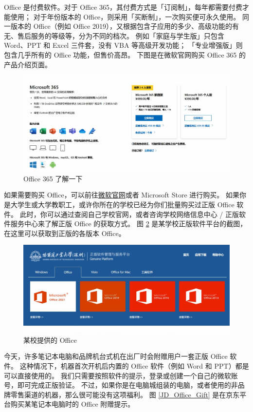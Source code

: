 Office 是付费软件。对于 Office 365，其付费方式是「订阅制」，每年都需要付费才能使用；
对于年份版本的 Office，则采用「买断制」，一次购买便可永久使用。
同一版本的 Office（例如 Office 2019），又根据包含子应用的多少、高级功能的有无、售后服务的等级等，分为不同的档次。
例如「家庭与学生版」只包含 Word、PPT 和 Excel 三件套，没有 VBA 等高级开发功能；
「专业增强版」则包含几乎所有的 Office 功能，但售价高昂。
下图是在微软官网购买 Office 365 的产品介绍页面。

\begin{figure}[htb!]
  \centering
  \includegraphics[width=12cm]{assets/Office_365.jpg}
  \caption{Office 365 了解一下}
  \label{Office_365}
\end{figure}

如果需要购买 Office，可以前往\href{https://www.microsoft.com/zh-CN/microsoft-365/buy/microsoft-365}{微软官网}或者 Microsoft Store 进行购买。
如果你是大学生或大学教职工，或许你所在的学校已经为你们批量购买过正版 Office 软件。
此时，你可以通过查阅自己学校官网，或者咨询学校网络信息中心 / 正版软件服务中心来了解正版 Office 的获取方式。
图 \ref{College_Office} 是某学校正版软件平台的截图，在这里可以获取到正版的各版本 Office。

\begin{figure}[htb!]
  \centering
  \includegraphics[width=12cm]{assets/College_Office.jpg}
  \caption{某校提供的 Office}
  \label{College_Office}
\end{figure}

今天，许多笔记本电脑和品牌机台式机在出厂时会附赠用户一套正版 Office 软件。
这种情况下，机器首次开机后内置的 Office 软件（例如 Word 和 PPT）都是可以直接使用的。
我们只需要按照软件的提示，登录或创建一个自己的微软账号，即可完成正版验证。
不过，如果你是在电脑城组装的电脑，或者使用的非品牌零售渠道的机器，那么很可能没有这项福利。
图 \ref{JD_Office_Gift} 是在京东平台购买某笔记本电脑时的 Office 附赠提示。

